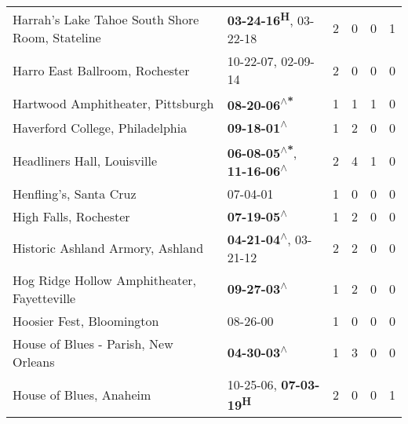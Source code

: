 \begin{supertabular}{p{0.4\textwidth}p{0.3\textwidth}p{0.05\textwidth}p{0.05\textwidth}p{0.05\textwidth}p{0.05\textwidth}}
                              Harrah’s Lake Tahoe South Shore Room, Stateline &                            \textbf{03-24-16\textsuperscript{H}}, 03-22-18\textsuperscript{} &  2 &  0 &  0 &  1 \\
                                               Harro East Ballroom, Rochester &                                      10-22-07\textsuperscript{}, 02-09-14\textsuperscript{} &  2 &  0 &  0 &  0 \\
                                            Hartwood Amphitheater, Pittsburgh &                                                \textbf{08-20-06\textsuperscript{$\wedge$*}} &  1 &  1 &  1 &  0 \\
                                              Haverford College, Philadelphia &                                                 \textbf{09-18-01\textsuperscript{$\wedge$}} &  1 &  2 &  0 &  0 \\
                                                  Headliners Hall, Louisville &   \textbf{06-08-05\textsuperscript{$\wedge$*}}, \textbf{11-16-06\textsuperscript{$\wedge$}} &  2 &  4 &  1 &  0 \\
                                                       Henfling's, Santa Cruz &                                                                  07-04-01\textsuperscript{} &  1 &  0 &  0 &  0 \\
                                                        High Falls, Rochester &                                                 \textbf{07-19-05\textsuperscript{$\wedge$}} &  1 &  2 &  0 &  0 \\
                                             Historic Ashland Armory, Ashland &                     \textbf{04-21-04\textsuperscript{$\wedge$}}, 03-21-12\textsuperscript{} &  2 &  2 &  0 &  0 \\
                                  Hog Ridge Hollow Amphitheater, Fayetteville &                                                 \textbf{09-27-03\textsuperscript{$\wedge$}} &  1 &  2 &  0 &  0 \\
                                                    Hoosier Fest, Bloomington &                                                                  08-26-00\textsuperscript{} &  1 &  0 &  0 &  0 \\
                                         House of Blues - Parish, New Orleans &                                                 \textbf{04-30-03\textsuperscript{$\wedge$}} &  1 &  3 &  0 &  0 \\
                                                      House of Blues, Anaheim &                            10-25-06\textsuperscript{}, \textbf{07-03-19\textsuperscript{H}} &  2 &  0 &  0 &  1 \\

\end{supertabular}
